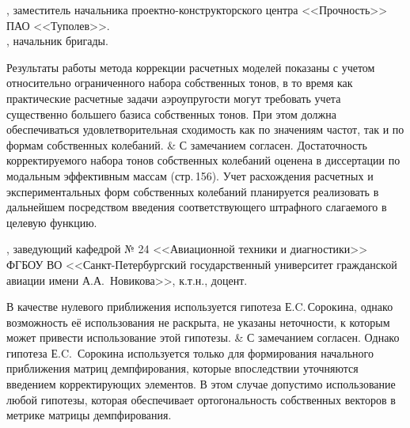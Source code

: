 \begin{frame}
	\beginSkip
	, заместитель начальника проектно-конструкторского центра <<Прочность>> ПАО <<Туполев>>. \\
	, начальник бригады. \\
	\begin{comtblr}{17em}
		Результаты работы метода коррекции расчетных моделей показаны с учетом относительно ограниченного набора собственных тонов, в то время как практические расчетные задачи аэроупругости могут требовать учета существенно большего базиса собственных тонов. При этом должна обеспечиваться удовлетворительная сходимость как по значениям частот, так и по формам собственных колебаний.
		&
		С замечанием согласен. Достаточность корректируемого набора тонов собственных колебаний оценена в диссертации по модальным эффективным массам (стр.\,156). Учет расхождения расчетных и экспериментальных форм собственных колебаний планируется реализовать в дальнейшем посредством введения соответствующего штрафного слагаемого в целевую функцию.
	\end{comtblr}
\end{frame}

\begin{frame}
	\beginSkip
	, заведующий кафедрой № 24 <<Авиационной техники и диагностики>> ФГБОУ ВО <<Санкт-Петербургский государственный университет гражданской авиации имени А.А.~Новикова>>, к.т.н., доцент.
	\begin{comtblr}{15em}
		В качестве нулевого приближения используется гипотеза Е.C.\,Сорокина, однако возможность её использования не раскрыта, не указаны неточности, к которым может привести использование этой гипотезы.
		&
		С замечанием согласен. Однако гипотеза Е.C.~Сорокина используется только для формирования начального приближения матриц демпфирования, которые впоследствии уточняются введением корректирующих элементов. В этом случае допустимо использование любой гипотезы, которая обеспечивает ортогональность собственных векторов в метрике матрицы демпфирования. 
	\end{comtblr}
\end{frame}

